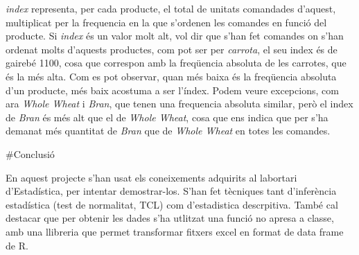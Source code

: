 \documentclass[
]{article}
\begin{document}
\emph{index} representa, per cada producte, el total de unitats
comandades d'aquest, multiplicat per la frequencia en la que s'ordenen
les comandes en funció del producte. Si \emph{index} és un valor molt
alt, vol dir que s'han fet comandes on s'han ordenat molts d'aquests
productes, com pot ser per \emph{carrota}, el seu index és de gairebé
1100, cosa que correspon amb la freqüencia absoluta de les carrotes, que
és la més alta. Com es pot observar, quan més baixa és la freqüencia
absoluta d'un producte, més baix acostuma a ser l'índex. Podem veure
excepcions, com ara \emph{Whole Wheat} i \emph{Bran}, que tenen una
frequencia absoluta similar, però el index de \emph{Bran} és més alt que
el de \emph{Whole Wheat}, cosa que ens indica que per s'ha demanat més
quantitat de \emph{Bran} que de \emph{Whole Wheat} en totes les
comandes.

\#Conclusió

En aquest projecte s'han usat els coneixements adquirits al labortari
d'Estadística, per intentar demostrar-los. S'han fet tècniques tant
d'inferència estadística (test de normalitat, TCL) com d'estadistica
descrpitiva. També cal destacar que per obtenir les dades s'ha utlitzat
una funció no apresa a classe, amb una llibreria que permet transformar
fitxers excel en format de data frame de R.
\end{document}
